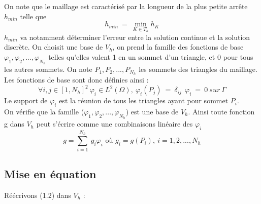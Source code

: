 \documentclass[a4paper,12pt,titlepage]{report}
\begin{document}
\begin{onehalfspace}
On note que le maillage est caractérisé par la longueur de la plus petite arrête $h_{min}$ telle que 
\[
h_{min} \ = \ \min_{K \in T_{h}} h_{K}
\]
$h_{min}$ va notamment déterminer l'erreur entre la solution continue et la solution discrète.
On choisit une base de $V_{h}$, on prend la famille des fonctions de base  \\ $\varphi_{1}, \varphi_{2}, ..., \varphi_{N_{h}}$  telles qu'elles valent 1 en un sommet d’un triangle, et 0 pour tous les autres sommets. On note $P_{1},P_{2}, ..., P_{N_{h}}$ les sommets des triangles du maillage.
Les fonctions de base sont donc définies ainsi :
\[
\forall i,j \in [1, N_{h}]^{2} \ \varphi_{i} \in L^{2}(\Omega),\ \varphi_{i}(P_{j}) \ = \ \delta_{ij} \ \
\varphi_{i} \ = \ 0 \ sur \ \Gamma \]
Le support de $ \varphi_{i}$ est la réunion de tous les triangles ayant pour sommet $P_{i}$.\\
On vérifie que la famille ($\varphi_{1}, \varphi_{2}, ..., \varphi_{N_{h}}$) est une base de $V_{h}$.
Ainsi toute fonction g dans $V_{h}$ peut s'écrire comme une combinaisons linéaire des $\varphi_{i}$
\[
g = \sum_{i=1}^{N_{h}}{\ g_{i}\varphi_{i}} \text{ \ \ où } g_{i} = g(P_{i}),\  i= 1,2,...,N_{h}
\]

\subsection{Mise en équation}

Réécrivons (1.2) dans $V_{h}$ : 


\end{onehalfspace}
\end{document}
